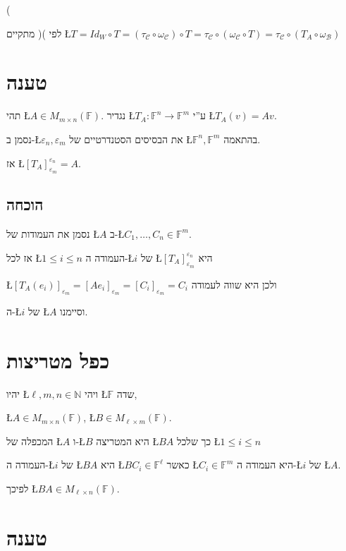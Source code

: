 \documentclass[english,hebrew]{article}
\begin{document}
{\endL}(

לפי ){\endL}( מתקיים \L{$T=Id_{W}\circ T=(\tau_{\mathcal{C}}\circ\omega_{\mathcal{C}})\circ T=\tau_{\mathcal{C}}\circ(\omega_{\mathcal{C}}\circ T)=\tau_{\mathcal{C}}\circ(T_{A}\circ\omega_{\mathcal{B}})$}

\section{טענה}

תהי \L{$A\in M_{m\times n}(\mathbb{F})$}. נגדיר \L{$T_{A}:\mathbb{F}^{n}\rightarrow\mathbb{F}^{m}$}
ע\textquotedblright י \L{$T_{A}(v)=Av$}.

נסמן ב-\L{$\varepsilon_{n},\varepsilon_{m}$} את הבסיסים הסטנדרטיים
של \L{$\mathbb{F}^{n},\mathbb{F}^{m}$} בהתאמה.

אז \L{$[T_{A}]_{\varepsilon_{m}}^{\varepsilon_{n}}=A$}.

\subsection{הוכחה}

נסמן את העמודות של \L{$A$} ב-\L{$C_{1},\dots,C_{n}\in\mathbb{F}^{m}$}.

אז לכל \L{$1\leq i\leq n$} העמודה ה-\L{$i$} של \L{$[T_{A}]_{\varepsilon_{m}}^{\varepsilon_{n}}$}
היא 

\L{$[T_{A}(e_{i})]_{\varepsilon_{m}}=[Ae_{i}]_{\varepsilon_{m}}=[C_{i}]_{\varepsilon_{m}}=C_{i}$}
ולכן היא שווה לעמודה

ה-\L{$i$} של \L{$A$} וסיימנו. 

\section{כפל מטריצות}

יהיו \L{$\ell,m,n\in\mathbb{N}$} ויהי \L{$\mathbb{F}$} שדה,

\L{$A\in M_{m\times n}(\mathbb{F})$}, \L{$B\in M_{\ell\times m}(\mathbb{F})$}.

המכפלה של \L{$A$} ו-\L{$B$} היא המטריצה \L{$BA$} כך שלכל \L{$1\leq i\leq n$}

העמודה ה-\L{$i$} של \L{$BA$} היא \L{$BC_{i}\in\mathbb{F}^{\ell}$}
כאשר \L{$C_{i}\in\mathbb{F}^{m}$} היא העמודה ה-\L{$i$} של \L{$A$}.

לפיכך \L{$BA\in M_{\ell\times n}(\mathbb{F})$}.

\section{טענה}
\end{document}
